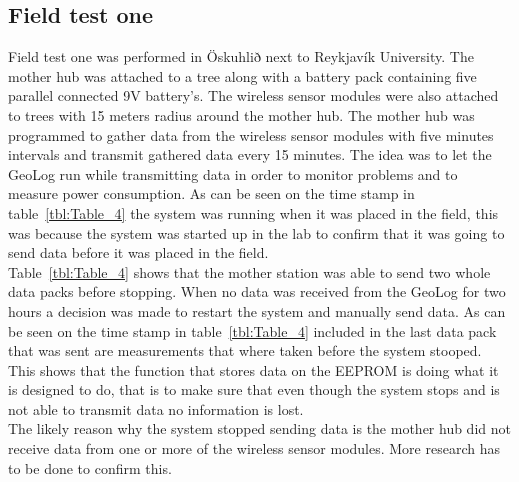 \subsection{Field test one}
Field test one was performed in Öskuhlið next to Reykjavík University. The mother hub was attached to a tree along with a battery pack containing five parallel connected 9V battery's. The wireless sensor modules were also attached to trees with 15 meters radius around the mother hub. The mother hub was programmed to gather data from the wireless sensor modules with five minutes intervals and transmit gathered data every 15 minutes. The idea was to let the GeoLog run while transmitting data in order to monitor problems and to measure power consumption. As can be seen on the time stamp  in table~\ref{tbl:Table_4} the system was running when it was placed in the field, this was because the system was started up in the lab to confirm that it was going to send data before it was placed in the field. \\
Table~\ref{tbl:Table_4} shows that the mother station was able to send two whole data packs before stopping. When no data was received from the GeoLog for two hours a decision was made to restart the system and manually send data. As can be seen on the time stamp in table~\ref{tbl:Table_4} included in the last data pack that was sent are measurements that where taken before the system stooped. This shows that the function that stores data on the EEPROM is doing what it is designed to do, that is to make sure that even though the system stops and is not able to transmit data no information is lost. \\
The likely reason why the system stopped sending data is the mother hub did not receive data from one or more of the wireless sensor modules. More research has to be done to confirm this.
